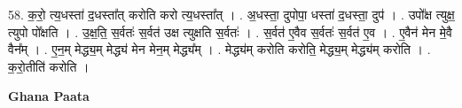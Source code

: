 \documentclass[17pt]{extarticle}
\begin{document}
58. क॒रो॒ त्य॒धस्ता॑ द॒धस्ता᳚त् करोति करो त्य॒धस्ता᳚त् । . अ॒धस्ता॒ दुपोपा॒ धस्ता॑ द॒धस्ता॒ दुप॑ । . उपो᳚क्ष त्युक्ष॒ त्युपो पो᳚क्षति । . उ॒क्ष॒ति॒ स॒र्वतः॑ स॒र्वत॑ उक्ष त्युक्षति स॒र्वतः॑ । . स॒र्वत॑ ए॒वैव स॒र्वतः॑ स॒र्वत॑ ए॒व । . ए॒वैन॑ मेन मे॒वै वैन᳚म् । . ए॒न॒म् मेद्ध्य॒म् मेद्ध्य॑ मेन मेन॒म् मेद्ध्य᳚म् । . मेद्ध्य॑म् करोति करोति॒ मेद्ध्य॒म् मेद्ध्य॑म् करोति । . क॒रो॒तीति॑ करोति । \newline

\textbf{Ghana Paata } \newline
\end{document}
